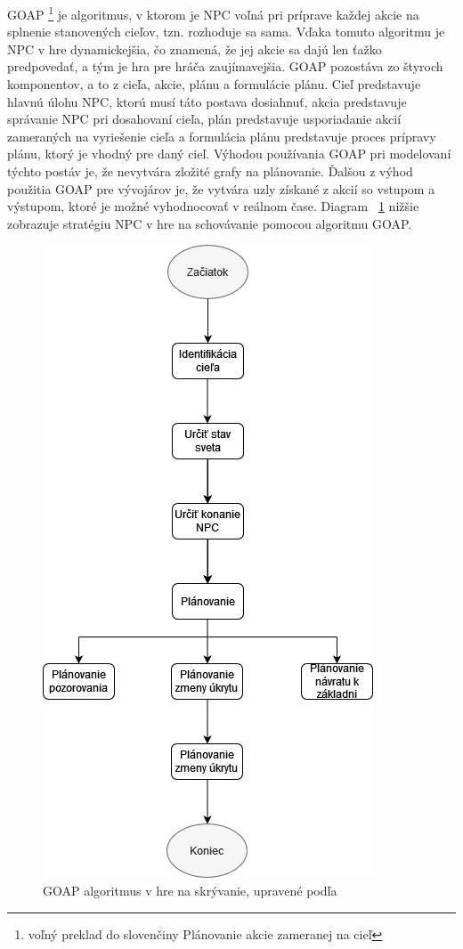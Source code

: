 \documentclass[10pt,twoside,slovak,a4paper]{article}
\begin{document}
\begin{itemize}
\quad GOAP \footnote{voľný preklad do slovenčiny Plánovanie akcie zameranej na cieľ} je algoritmus, v ktorom je NPC voľná pri príprave každej akcie na splnenie stanovených cieľov, tzn. rozhoduje sa sama. Vďaka tomuto algoritmu je NPC v hre dynamickejšia, čo znamená, že jej akcie sa dajú len ťažko predpovedať, a tým je hra pre hráča zaujímavejšia. GOAP pozostáva zo štyroch komponentov, a to z cieľa, akcie, plánu a formulácie plánu. Cieľ predstavuje hlavnú úlohu NPC, ktorú musí táto postava dosiahnuť, akcia predstavuje správanie NPC pri dosahovaní cieľa, plán predstavuje usporiadanie akcií zameraných na vyriešenie cieľa a formulácia plánu predstavuje proces prípravy plánu, ktorý je vhodný pre daný cieľ.  Výhodou používania GOAP pri modelovaní týchto postáv je, že nevytvára zložité grafy na plánovanie. Ďalšou z výhod použitia GOAP pre vývojárov je, že vytvára uzly získané z akcií so vstupom a výstupom, ktoré je možné vyhodnocovať v reálnom čase. Diagram ~\ref{f:d1} nižšie zobrazuje stratégiu NPC v hre na schovávanie pomocou algoritmu GOAP. 
\begin{figure}[tbh]
\center\includegraphics[scale=0.5]{diagram1.png}
\caption{GOAP algoritmus v hre na skrývanie, upravené podľa \cite{NPC} }
\label{f:d1}
\end{figure}
\end{itemize}
\end{document}
